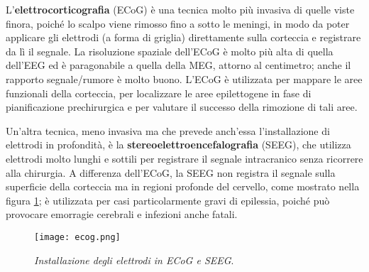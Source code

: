 \documentclass{report}
\newcommand{\figref}[1]{figura \ref{#1}}
\numberwithin{equation}{section}
\numberwithin{figure}{section}
\begin{document}
L'\textbf{elettrocorticografia} (ECoG) è una tecnica molto più invasiva di quelle viste finora, poiché lo scalpo viene rimosso fino a sotto le meningi, in modo da poter applicare gli elettrodi (a forma di griglia) direttamente sulla corteccia e registrare da lì il segnale. La risoluzione spaziale dell'ECoG è molto più alta di quella dell'EEG ed è paragonabile a quella della MEG, attorno al centimetro; anche il rapporto segnale/rumore è molto buono. L'ECoG è utilizzata per mappare le aree funzionali della corteccia, per localizzare le aree epilettogene in fase di pianificazione prechirurgica e per valutare il successo della rimozione di tali aree.

Un'altra tecnica, meno invasiva ma che prevede anch'essa l'installazione di elettrodi in profondità, è la \textbf{stereoelettroencefalografia} (SEEG), che utilizza elettrodi molto lunghi e sottili per registrare il segnale intracranico senza ricorrere alla chirurgia. A differenza dell'ECoG, la SEEG non registra il segnale sulla superficie della corteccia ma in regioni profonde del cervello, come mostrato nella \figref{fig:ecog}; è utilizzata per casi particolarmente gravi di epilessia, poiché può provocare emorragie cerebrali e infezioni anche fatali.

\begin{figure}[htp]
    \centering
    \texttt{[image: ecog.png]}
    \caption{\label{fig:ecog} \textit{Installazione degli elettrodi in ECoG e SEEG}.}
\end{figure}
\end{document}
